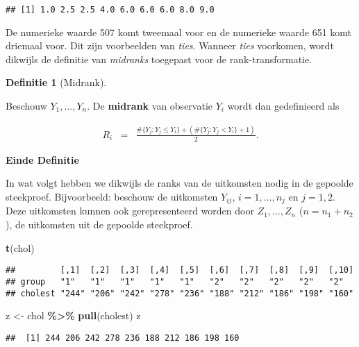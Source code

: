 \documentclass[
  12pt,dutch,coursenotes]{book}
\newenvironment{Shaded}{\begin{snugshade}}{\end{snugshade}}
\newcommand{\KeywordTok}[1]{\textcolor[rgb]{0.13,0.29,0.53}{\textbf{#1}}}
\newcommand{\NormalTok}[1]{#1}
\newcommand{\OperatorTok}[1]{\textcolor[rgb]{0.81,0.36,0.00}{\textbf{#1}}}
\newcommand{\StringTok}[1]{\textcolor[rgb]{0.31,0.60,0.02}{#1}}
\theoremstyle{definition}
\newtheorem{definition}{Definitie}[chapter]
\theoremstyle{definition}
\theoremstyle{definition}
\theoremstyle{remark}
\begin{document}
\begin{verbatim}
## [1] 1.0 2.5 2.5 4.0 6.0 6.0 6.0 8.0 9.0
\end{verbatim}

De numerieke waarde 507 komt tweemaal voor en de numerieke waarde 651 komt driemaal voor. Dit zijn voorbeelden van \emph{ties}.
Wanneer \emph{ties} voorkomen, wordt dikwijls de definitie van \emph{midranks} toegepast voor de rank-transformatie.

\begin{definition}[Midrank]
\protect\hypertarget{def:unnamed-chunk-210}{}{\label{def:unnamed-chunk-210} \iffalse (Midrank) \fi{} }
\end{definition}
Beschouw \(Y_1, \ldots, Y_n\).
De \textbf{midrank} van observatie \(Y_i\) wordt dan
gedefinieerd als

\begin{eqnarray*}
  R_i &=& \frac{ \#\{Y_j: Y_j\leq Y_i\} + ( \#\{Y_j: Y_j < Y_i\} +1)}{2}.
\end{eqnarray*}

\textbf{Einde Definitie}

In wat volgt hebben we dikwijls de ranks van de uitkomsten nodig in de gepoolde steekproef. Bijvoorbeeld: beschouw de uitkomsten \(Y_{ij}\), \(i=1,\ldots, n_j\) en \(j=1,2\).
Deze uitkomsten kunnen ook gerepresenteerd worden door \(Z_1,\ldots, Z_n\) (\(n=n_1+n_2\)), de uitkomsten uit de gepoolde steekproef.

\begin{Shaded}
\begin{Highlighting}[]
\KeywordTok{t}\NormalTok{(chol)}
\end{Highlighting}
\end{Shaded}

\begin{verbatim}
##         [,1]  [,2]  [,3]  [,4]  [,5]  [,6]  [,7]  [,8]  [,9]  [,10]
## group   "1"   "1"   "1"   "1"   "1"   "2"   "2"   "2"   "2"   "2"  
## cholest "244" "206" "242" "278" "236" "188" "212" "186" "198" "160"
\end{verbatim}

\begin{Shaded}
\begin{Highlighting}[]
\NormalTok{z \textless{}{-}}\StringTok{ }\NormalTok{chol }\OperatorTok{\%\textgreater{}\%}\StringTok{ }\KeywordTok{pull}\NormalTok{(cholest)}
\NormalTok{z}
\end{Highlighting}
\end{Shaded}

\begin{verbatim}
##  [1] 244 206 242 278 236 188 212 186 198 160
\end{verbatim}
\end{document}
